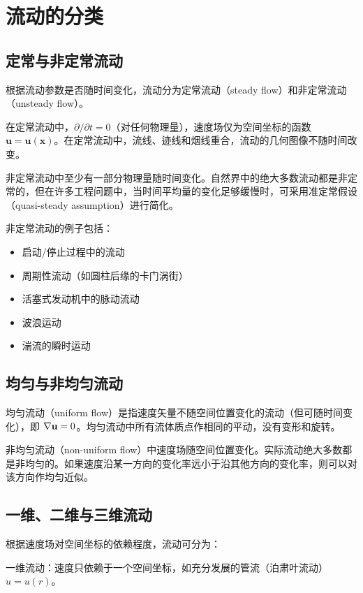 \section{流动的分类}

\subsection{定常与非定常流动}

根据流动参数是否随时间变化，流动分为定常流动（steady flow）和非定常流动（unsteady flow）。

在定常流动中，\(\partial/\partial t = 0\)（对任何物理量），速度场仅为空间坐标的函数 \(\mathbf{u} = \mathbf{u}(\mathbf{x})\)。在定常流动中，流线、迹线和烟线重合，流动的几何图像不随时间改变。

非定常流动中至少有一部分物理量随时间变化。自然界中的绝大多数流动都是非定常的，但在许多工程问题中，当时间平均量的变化足够缓慢时，可采用准定常假设（quasi-steady assumption）进行简化。

非定常流动的例子包括：
\begin{itemize}
    \item 启动/停止过程中的流动
    \item 周期性流动（如圆柱后缘的卡门涡街）
    \item 活塞式发动机中的脉动流动
    \item 波浪运动
    \item 湍流的瞬时运动
\end{itemize}

\subsection{均匀与非均匀流动}

均匀流动（uniform flow）是指速度矢量不随空间位置变化的流动（但可随时间变化），即 \(\nabla\mathbf{u} = 0\)。均匀流动中所有流体质点作相同的平动，没有变形和旋转。

非均匀流动（non-uniform flow）中速度场随空间位置变化。实际流动绝大多数都是非均匀的。如果速度沿某一方向的变化率远小于沿其他方向的变化率，则可以对该方向作均匀近似。

\subsection{一维、二维与三维流动}

根据速度场对空间坐标的依赖程度，流动可分为：

一维流动：速度只依赖于一个空间坐标，如充分发展的管流（泊肃叶流动）\(u = u(r)\)。

